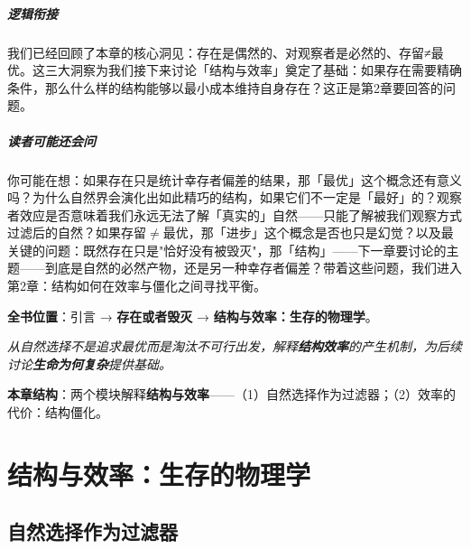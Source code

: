\documentclass[openany, a4paper, 12pt]{book}
\begin{document}
	\paragraph*{逻辑衔接}
	我们已经回顾了本章的核心洞见：存在是偶然的、对观察者是必然的、存留≠最优。这三大洞察为我们接下来讨论「结构与效率」奠定了基础：如果存在需要精确条件，那么什么样的结构能够以最小成本维持自身存在？这正是第2章要回答的问题。

	\paragraph*{读者可能还会问}
	你可能在想：如果存在只是统计幸存者偏差的结果，那「最优」这个概念还有意义吗？为什么自然界会演化出如此精巧的结构，如果它们不一定是「最好」的？观察者效应是否意味着我们永远无法了解「真实的」自然——只能了解被我们观察方式过滤后的自然？如果存留$\neq$最优，那「进步」这个概念是否也只是幻觉？以及最关键的问题：既然存在只是"恰好没有被毁灭"，那「结构」——下一章要讨论的主题——到底是自然的必然产物，还是另一种幸存者偏差？带着这些问题，我们进入第2章：结构如何在效率与僵化之间寻找平衡。




	\textbf{\large 全书位置}：引言 → \textbf{存在或者毁灭} → \textbf{结构与效率：生存的物理学}。

	\textit{从自然选择不是追求最优而是淘汰不可行出发，解释\textbf{结构效率}的产生机制，为后续讨论\textbf{生命为何复杂}提供基础。}

	\vspace{1em}

	\textbf{\large 本章结构}：两个模块解释\textbf{结构与效率}——（1）自然选择作为过滤器；（2）效率的代价：结构僵化。

	\vspace{1em}


\chapter{结构与效率：生存的物理学}
\label{chap:structure_efficiency}


\label{sec:selection_filter}

\section{自然选择作为过滤器}
\end{document}
